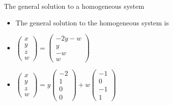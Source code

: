 \documentclass{beamer}
\begin{document}
\begin{frame}{The general solution to a homogeneous system}

\begin{itemize}
\item The general solution to the homogeneous system is
\item
$
\begin{pmatrix}
x \\ y \\ z \\ w
\end{pmatrix}
=
\begin{pmatrix}
-2y - w \\
y \\
-w \\
w
\end{pmatrix}
$
\item
$
\begin{pmatrix}
x \\ y \\ z \\ w
\end{pmatrix}
=
y
\begin{pmatrix}
-2 \\
1 \\
0 \\
0
\end{pmatrix}
+
w
\begin{pmatrix}
-1 \\
0 \\
-1 \\
1
\end{pmatrix}
$
\end{itemize}
\end{frame}
\end{document}
